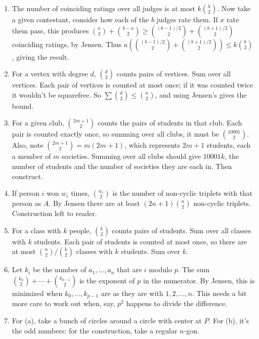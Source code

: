 \documentclass[11pt,paper=letter]{scrartcl}
\begin{document}
\begin{enumerate}

\item The number of coinciding ratings over all judges is at most $k\binom{b}{2}$. Now take a given contestant, consider how each of the $b$ judges rate them. If $x$ rate them pass, this produces $\binom{x}{2} + \binom{b-x}{2} \ge \binom{(b-1)/2}{2} + \binom{(b + 1)/2}{2}$ coinciding ratings, by Jensen. Thus $a\left(\binom{(b-1)/2}{2} + \binom{(b + 1)/2}{2}\right) \le k\binom{b}{2}$, giving the result.

\item For a vertex with degree $d$, $\binom{d}{2}$ counts pairs of vertices. Sum over all vertices. Each pair of vertices is counted at most once; if it was counted twice it wouldn't be squarefree. So $\sum \binom{d}{2} \le \binom{n}{2}$, and using Jensen's gives the bound.

\item For a given club, $\binom{2m + 1}{2}$ counts the pairs of students in that club. Each pair is counted exactly once, so summing over all clubs, it must be $\binom{10001}{2}$. Also, note $\binom{2m + 1}{2} = m(2m + 1)$, which represents $2m + 1$ students, each a member of $m$ societies. Summing over all clubs should give $10001k$, the number of students and the number of societies they are each in. Then construct.

\item If person $i$ won $w_i$ times, $\binom{w_i}{2}$ is the number of non-cyclic triplets with that person as $A$. By Jensen there are at least $(2n + 1)\binom{n}{2}$ non-cyclic triplets. Construction left to reader.

\item For a class with $k$ people, $\binom{k}{2}$ counts pairs of students. Sum over all classes with $k$ students. Each pair of students is counted at most once, so there are at most $\binom{n}{2}/\binom{k}{2}$ classes with $k$ students. Sum over $k$.

\item Let $k_i$ be the number of $a_1, \ldots, a_n$ that are $i$ modulo $p$. The sum $\binom{k_0}{2} + \cdots + \binom{k_{p-1}}{2}$ is the exponent of $p$ in the numerator. By Jensen, this is minimized when $k_0, \ldots, k_{p-1}$ are as they are with $1, 2, \ldots, n$. This needs a bit more care to work out when, say, $p^2$ happens to divide the difference.

\item For (a), take a bunch of circles around a circle with center at $P$. For (b), it's the odd numbers: for the construction, take a regular $n$-gon.


\end{enumerate}
\end{document}
